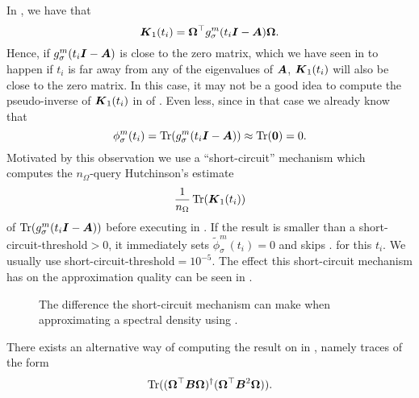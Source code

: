 In , we have that
\begin{equation}
    \boldsymbol{K}_1(t_i) = \boldsymbol{\Omega}^{\top} g_{\sigma}^m(t_i\boldsymbol{I} - \boldsymbol{A}) \boldsymbol{\Omega}.
    \label{equ:3-nystrom-interpolated-matrix}
\end{equation}
Hence, if $g_{\sigma}^m(t_i\boldsymbol{I} - \boldsymbol{A})$ is close to the zero matrix,
which we have seen in  to happen if
$t_i$ is far away from any of the eigenvalues of $\boldsymbol{A}$, $\boldsymbol{K}_1(t_i)$ will
also be close to the zero matrix. In this case, it may not be a good idea to
compute the pseudo-inverse of $\boldsymbol{K}_1(t_i)$ in 
of . Even less, since in that case we already know that
\begin{equation}
    \phi_{\sigma}^m(t_i) = \operatorname{Tr}(g_{\sigma}^m(t_i\boldsymbol{I} - \boldsymbol{A})) \approx \operatorname{Tr}(\boldsymbol{0}) = 0.
    \label{equ:3-nystrom-short-circuit}
\end{equation}
Motivated by this observation we use a \enquote{short-circuit} mechanism which 
computes the $n_{\Omega}$-query Hutchinson's estimate 
\begin{equation}
    \frac{1}{n_{\Omega}} \operatorname{Tr}(\boldsymbol{K}_1(t_i))
    \label{equ:3-nystrom-short-circuit-hutchinson}
\end{equation}
of $\operatorname{Tr}(g_{\sigma}^m(t_i\boldsymbol{I} - \boldsymbol{A}))$
before executing  in .
If the result is smaller than a \gls{short-circuit-threshold}$> 0$, it immediately sets
$\widetilde{\phi}_{\sigma}^m(t_i)=0$ and skips .
for this $t_i$. We usually use \gls{short-circuit-threshold}$= 10^{-5}$. The effect this short-circuit
mechanism has on the approximation quality can be seen in .\\

\begin{figure}[ht]
    \centering
    
    \caption{The difference the short-circuit mechanism can make when approximating
        a spectral density using .}
    \label{fig:3-nystrom-short-circuit-mechanism}
\end{figure}

There exists an alternative way of computing the result on 
in , namely traces of the form
\begin{equation}
    \operatorname{Tr}((\boldsymbol{\Omega}^{\top} \boldsymbol{B} \boldsymbol{\Omega})^{\dagger}(\boldsymbol{\Omega}^{\top} \boldsymbol{B}^2 \boldsymbol{\Omega})).
    \label{equ:3-nystrom-trace-pseudo-inverse}
\end{equation}

